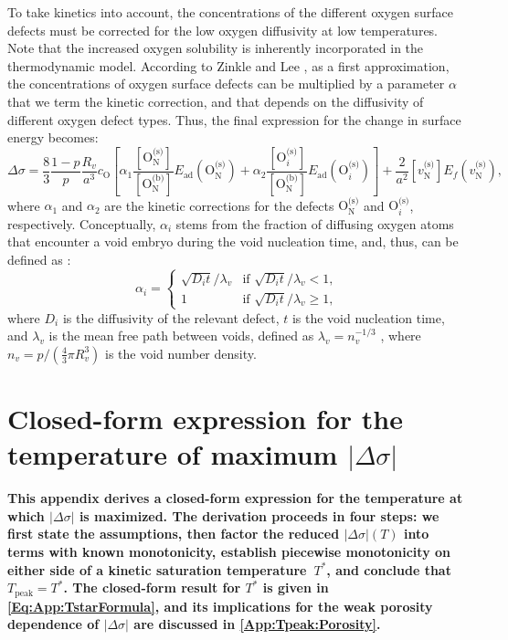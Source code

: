 \documentclass[preprint,12pt,sort&compress]{elsarticle}
\newcommand{\?}{\stackrel{?}{=}}
\providecommand{\DIFaddtex}[1]{{\bf #1}} %
\providecommand{\DIFaddbegin}{\protect\color{blue}} %
\providecommand{\DIFadd}[1]{\texorpdfstring{\DIFaddtex{#1}}{#1}} %
\newcommand{\DIFaddincludegraphics}[2][]{{\color{blue}\fbox{\DIFOincludegraphics[#1]{#2}}}} %
\DeclareRobustCommand{\DIFaddbegin}{\DIFOaddbegin \let\includegraphics\DIFaddincludegraphics} %
\begin{document}
To take kinetics into account, the concentrations of the different oxygen surface defects must be corrected for the low oxygen diffusivity at low temperatures. Note that the increased oxygen solubility is inherently incorporated in the thermodynamic model. According to Zinkle and Lee \cite{Zinkle1990}, as a first approximation, the concentrations of oxygen surface defects can be multiplied by a parameter $\alpha$ that we term the kinetic correction, and that depends on the diffusivity of different oxygen defect types. Thus, the final expression for the change in surface energy becomes:
\begin{equation}
\Delta \sigma = \frac{8}{3} \frac{1-p}{p} \frac{R_v}{a^3} c_\text{O} \left[ \alpha_1 \frac{ [ \text{O}_\text{N}^{\text{(s)}} ] }{ [ \text{O}_\text{N}^{\text{(b)}} ] }  E_\text{ad}( \text{O}_\text{N}^{\text{(s)}} ) + \alpha_2 \frac{ [ \text{O}_i^{\text{(s)}} ] }{ [ \text{O}_\text{N}^{\text{(b)}} ] }  E_\text{ad}( \text{O}_i^{\text{(s)}} ) \right] + \frac{2}{a^2} [ v_\text{N}^{\text{(s)}} ] E_f ( v_\text{N}^{\text{(s)}} ),
\end{equation}
where $\alpha_1$ and $\alpha_2$ are the kinetic corrections for the defects $\text{O}_\text{N}^\text{(s)}$ and $\text{O}_i^{\text{(s)}}$, respectively. Conceptually, $\alpha_i$ stems from the fraction of diffusing oxygen atoms that encounter a void embryo during the void nucleation time, and, thus, can be defined as \cite{Zinkle1990}:
\begin{equation}
\alpha_i =
\begin{cases}
    \sqrt{D_i t}/\lambda_v & \text{if } \sqrt{D_i t}/\lambda_v < 1, \\
    1 & \text{if } \sqrt{D_i t}/\lambda_v \geq 1,
\end{cases}    
\end{equation}
where $D_i$ is the diffusivity of the relevant defect, $t$ is the void nucleation time, and $\lambda_v$ is the mean free path between voids, defined as $\lambda_v = n_v^{-1/3}$ \cite{Olander2021}, where $n_v = p / ( \frac{4}{3} \pi R_v^3 ) $ is the void number density.

\FloatBarrier

\DIFaddbegin \section{\DIFadd{Closed-form expression for the temperature of maximum $|\Delta \sigma|$}}
\label{App:Tpeak}

\DIFadd{This appendix derives a closed-form expression for the temperature at which $|\Delta \sigma|$ is maximized. The derivation proceeds in four steps: we first state the assumptions, then factor the reduced $|\Delta \sigma|(T)$ into terms with known monotonicity, establish piecewise monotonicity on either side of a kinetic saturation temperature~$T^*$, and conclude that $T_\text{peak} = T^*$. The closed-form result for $T^*$ is given in \cref{Eq:App:TstarFormula}, and its implications for the weak porosity dependence of $|\Delta \sigma|$ are discussed in \ref{App:Tpeak:Porosity}.
}
\end{document}
